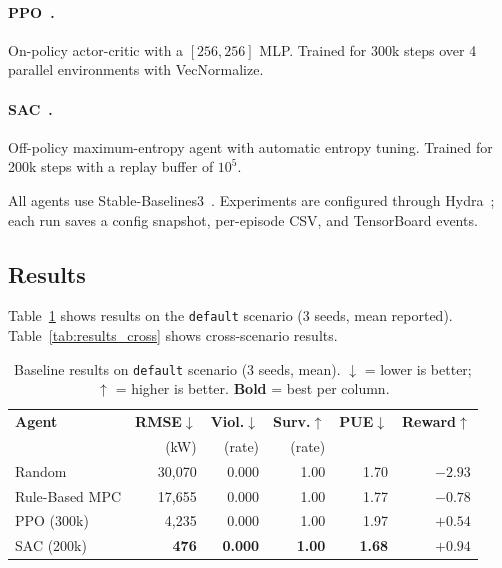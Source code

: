 \documentclass{article}
\begin{document}
\paragraph{PPO~\citep{schulman2017ppo}.}
On-policy actor-critic with a $[256, 256]$ MLP.
Trained for 300k steps over 4 parallel environments with VecNormalize.

\paragraph{SAC~\citep{haarnoja2018sac}.}
Off-policy maximum-entropy agent with automatic entropy tuning.
Trained for 200k steps with a replay buffer of $10^5$.

All agents use Stable-Baselines3~\citep{raffin2021stable}.
Experiments are configured through Hydra~\citep{hydra2019}; each run
saves a config snapshot, per-episode CSV, and TensorBoard events.

\subsection{Results}
\label{sec:results}

Table~\ref{tab:results_default} shows results on the \texttt{default}
scenario (3 seeds, mean reported).
Table~\ref{tab:results_cross} shows cross-scenario results.

\begin{table}[t]
\centering
\caption{Baseline results on \texttt{default} scenario (3 seeds, mean).
$\downarrow$ = lower is better; $\uparrow$ = higher is better.
\textbf{Bold} = best per column.}
\label{tab:results_default}
\small
\begin{tabular}{lrrrrr}
\toprule
\textbf{Agent} & \textbf{RMSE$\downarrow$} & \textbf{Viol.$\downarrow$} & \textbf{Surv.$\uparrow$} & \textbf{PUE$\downarrow$} & \textbf{Reward$\uparrow$} \\
 & (kW) & (rate) & (rate) & & \\
\midrule
Random         & 30,070 & 0.000 & 1.00 & 1.70 & $-2.93$ \\
Rule-Based MPC & 17,655 & 0.000 & 1.00 & 1.77 & $-0.78$ \\
PPO (300k)     &  4,235 & 0.000 & 1.00 & 1.97 & $+0.54$ \\
SAC (200k)     &  \textbf{476} & \textbf{0.000} & \textbf{1.00} & \textbf{1.68} & $\mathbf{+0.94}$ \\
\bottomrule
\end{tabular}
\end{table}
\end{document}
